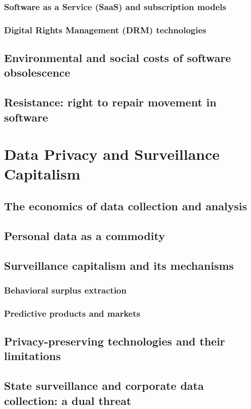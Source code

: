 \subsubsection{Software as a Service (SaaS) and subscription models}
\subsubsection{Digital Rights Management (DRM) technologies}
\subsection{Environmental and social costs of software obsolescence}
\subsection{Resistance: right to repair movement in software}

\newpage
\section{Data Privacy and Surveillance Capitalism}
\subsection{The economics of data collection and analysis}
\subsection{Personal data as a commodity}
\subsection{Surveillance capitalism and its mechanisms}
\subsubsection{Behavioral surplus extraction}
\subsubsection{Predictive products and markets}
\subsection{Privacy-preserving technologies and their limitations}
\subsection{State surveillance and corporate data collection: a dual threat}
